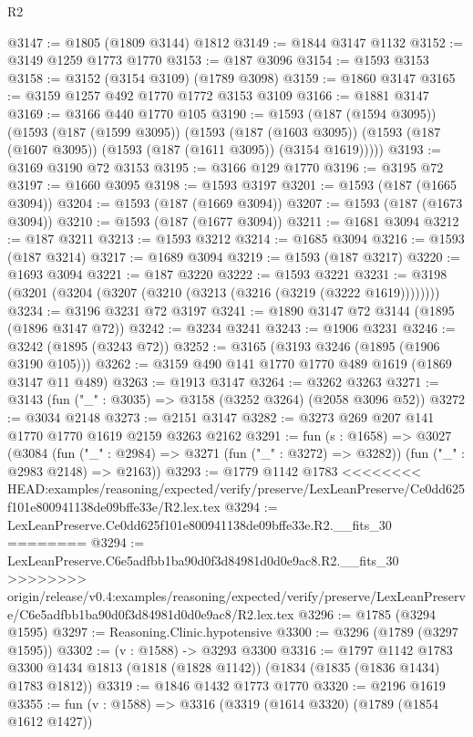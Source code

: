 \begin{lexlean}{R2}
\begin{coremodule}
{{{{{{{{{{{{{{{{{{{{{{{{{{{{{{{{{{{{{{{{{{{{{{{{{{{{{{{{{{{{{{{{{{{{{{{{{{{{{{{{{{{{{{{{{{{{@3147 := @1805 (@1809 @3144) @1812
@3149 := @1844 @3147 @1132
@3152 := @3149 @1259 @1773 @1770
@3153 := @187 @3096
@3154 := @1593 @3153
@3158 := @3152 (@3154 @3109) (@1789 @3098)
@3159 := @1860 @3147
@3165 := @3159 @1257 @492 @1770 @1772 @3153 @3109
@3166 := @1881 @3147
@3169 := @3166 @440 @1770 @105
@3190 := @1593
    (@187 (@1594 @3095))
    (@1593
      (@187 (@1599 @3095))
      (@1593
        (@187 (@1603 @3095))
        (@1593 (@187 (@1607 @3095)) (@1593 (@187 (@1611 @3095)) (@3154 @1619)))))
@3193 := @3169 @3190 @72 @3153
@3195 := @3166 @129 @1770
@3196 := @3195 @72
@3197 := @1660 @3095
@3198 := @1593 @3197
@3201 := @1593 (@187 (@1665 @3094))
@3204 := @1593 (@187 (@1669 @3094))
@3207 := @1593 (@187 (@1673 @3094))
@3210 := @1593 (@187 (@1677 @3094))
@3211 := @1681 @3094
@3212 := @187 @3211
@3213 := @1593 @3212
@3214 := @1685 @3094
@3216 := @1593 (@187 @3214)
@3217 := @1689 @3094
@3219 := @1593 (@187 @3217)
@3220 := @1693 @3094
@3221 := @187 @3220
@3222 := @1593 @3221
@3231 := @3198 (@3201 (@3204 (@3207 (@3210 (@3213 (@3216 (@3219 (@3222 @1619))))))))
@3234 := @3196 @3231 @72 @3197
@3241 := @1890 @3147 @72 @3144 (@1895 (@1896 @3147 @72))
@3242 := @3234 @3241
@3243 := @1906 @3231
@3246 := @3242 (@1895 (@3243 @72))
@3252 := @3165 (@3193 @3246 (@1895 (@1906 @3190 @105)))
@3262 := @3159 @490 @141 @1770 @1770 @489 @1619 (@1869 @3147 @11 @489)
@3263 := @1913 @3147
@3264 := @3262 @3263
@3271 := @3143 (fun ("_" : @3035) => @3158 (@3252 @3264) (@2058 @3096 @52))
@3272 := @3034 @2148
@3273 := @2151 @3147
@3282 := @3273 @269 @207 @141 @1770 @1770 @1619 @2159 @3263 @2162
@3291 := fun (s : @1658) =>
  @3027
    (@3084
      (fun ("_" : @2984) => @3271 (fun ("_" : @3272) => @3282))
      (fun ("_" : @2983 @2148) => @2163))
@3293 := @1779 @1142 @1783
<<<<<<<< HEAD:examples/reasoning/expected/verify/preserve/LexLeanPreserve/Ce0dd625f101e800941138de09bffe33e/R2.lex.tex
@3294 := LexLeanPreserve.Ce0dd625f101e800941138de09bffe33e.R2.__fits_30
========
@3294 := LexLeanPreserve.C6e5adfbb1ba90d0f3d84981d0d0e9ac8.R2.__fits_30
>>>>>>>> origin/release/v0.4:examples/reasoning/expected/verify/preserve/LexLeanPreserve/C6e5adfbb1ba90d0f3d84981d0d0e9ac8/R2.lex.tex
@3296 := @1785 (@3294 @1595)
@3297 := Reasoning.Clinic.hypotensive
@3300 := @3296 (@1789 (@3297 @1595))
@3302 := (v : @1588) -> @3293 @3300
@3316 := @1797
    @1142
    @1783
    @3300
    @1434
    @1813
    (@1818 (@1828 @1142))
    (@1834 (@1835 (@1836 @1434) @1783 @1812))
@3319 := @1846 @1432 @1773 @1770
@3320 := @2196 @1619
@3355 := fun (v : @1588) =>
  @3316
    (@3319
      (@1614 @3320)
      (@1789 (@1854 @1612 @1427))
}}}}}}}}}}}}}}}}}}}}}}}}}}}}}}}}}}}}}}}}}}}}}}}}}}}}}}}}}}}}}}}}}}}}}}}}}}}}}}}}}}}}}}}}}}}}
\end{coremodule}
\end{lexlean}
